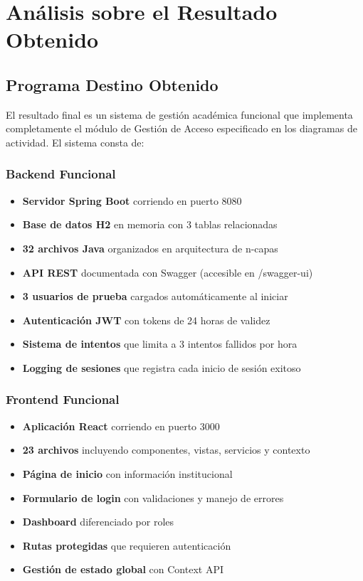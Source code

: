 \documentclass[11pt,a4paper]{article}
\begin{document}
\newpage

\section{Análisis sobre el Resultado Obtenido}

\subsection{Programa Destino Obtenido}

El resultado final es un sistema de gestión académica funcional que implementa completamente el módulo de Gestión de Acceso especificado en los diagramas de actividad. El sistema consta de:

\subsubsection{Backend Funcional}

\begin{itemize}
    \item \textbf{Servidor Spring Boot} corriendo en puerto 8080
    \item \textbf{Base de datos H2} en memoria con 3 tablas relacionadas
    \item \textbf{32 archivos Java} organizados en arquitectura de n-capas
    \item \textbf{API REST} documentada con Swagger (accesible en /swagger-ui)
    \item \textbf{3 usuarios de prueba} cargados automáticamente al iniciar
    \item \textbf{Autenticación JWT} con tokens de 24 horas de validez
    \item \textbf{Sistema de intentos} que limita a 3 intentos fallidos por hora
    \item \textbf{Logging de sesiones} que registra cada inicio de sesión exitoso
\end{itemize}

\subsubsection{Frontend Funcional}

\begin{itemize}
    \item \textbf{Aplicación React} corriendo en puerto 3000
    \item \textbf{23 archivos} incluyendo componentes, vistas, servicios y contexto
    \item \textbf{Página de inicio} con información institucional
    \item \textbf{Formulario de login} con validaciones y manejo de errores
    \item \textbf{Dashboard} diferenciado por roles
    \item \textbf{Rutas protegidas} que requieren autenticación
    \item \textbf{Gestión de estado global} con Context API
\end{itemize}
\end{document}
